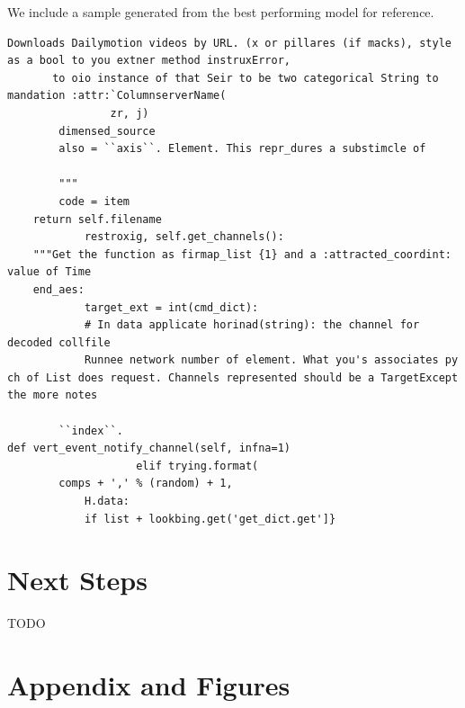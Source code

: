 \documentclass{article}
\begin{document}
We include a sample generated from the best performing model for reference.
\begin{verbatim}
Downloads Dailymotion videos by URL. (x or pillares (if macks), style as a bool to you extner method instruxError,
       to oio instance of that Seir to be two categorical String to mandation :attr:`ColumnserverName(
                zr, j)
        dimensed_source
        also = ``axis``. Element. This repr_dures a substimcle of

        """
        code = item
    return self.filename
            restroxig, self.get_channels():
    """Get the function as firmap_list {1} and a :attracted_coordint: value of Time
    end_aes:
            target_ext = int(cmd_dict):
            # In data applicate horinad(string): the channel for decoded collfile
            Runnee network number of element. What you's associates py ch of List does request. Channels represented should be a TargetExcept the more notes

        ``index``.
def vert_event_notify_channel(self, infna=1)
                    elif trying.format(
        comps + ',' % (random) + 1,
            H.data:
            if list + lookbing.get('get_dict.get']}
\end{verbatim}

\section{Next Steps}
TODO





\newpage
\section*{Appendix and Figures}
\end{document}
